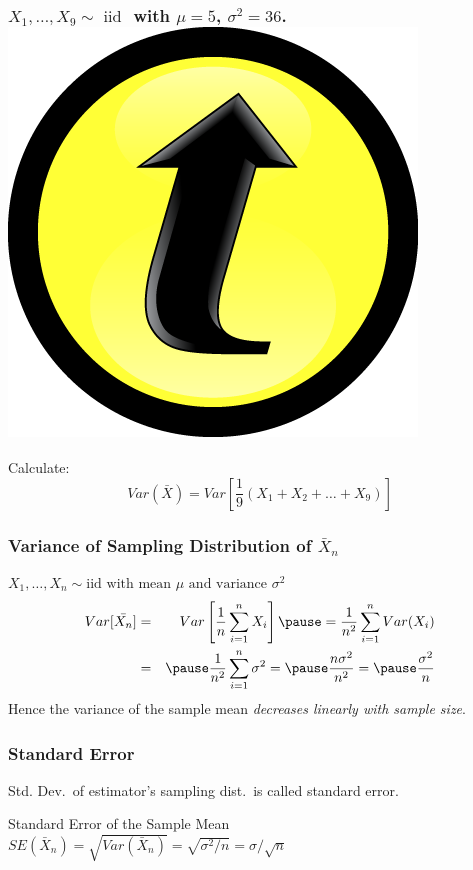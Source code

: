 \documentclass[handout]{beamer}
\begin{document}
\begin{frame}
\frametitle{$X_1,\hdots, X_{9} \sim \mbox{ iid }$ with $\mu=5$, $\sigma^2 = 36$. \hfill\includegraphics[scale = 0.05]{./images/clicker}}

\large Calculate:
	 $$Var(\bar{X}) = Var\left[\frac{1}{9}(X_1 + X_2 + \hdots + X_{9})\right]$$
\end{frame}

\begin{frame}
\frametitle{Variance of Sampling Distribution of $\bar{X}_n$}
\alert{$X_1, \hdots, X_n \sim \mbox{iid with mean }\mu \mbox{ and variance } \sigma^2$}
\begin{eqnarray*}
Var[\bar{X_n}] &=& Var\left[ \frac{1}{n}\sum_{i=1}^n X_i \right] \pause= \frac{1}{n^2} \sum_{i=1}^n Var(X_i) \\
&=& \pause \frac{1}{n^2} \sum_{i=1}^n \sigma^2 = \pause \frac{n\sigma^2}{n^2} = \pause \frac{\sigma^2}{n}
\end{eqnarray*}
\pause
\alert{Hence the variance of the sample mean \emph{decreases linearly with sample size}.}
\end{frame}
\begin{frame}
\frametitle{Standard Error}
Std. Dev.\ of estimator's sampling dist.\ is called \alert{standard error}.
\begin{block}{Standard Error of the Sample Mean}
$SE(\bar{X}_n)= \sqrt{Var\left(\bar{X}_n\right)}= \sqrt{\sigma^2/n}=\sigma/\sqrt{n}$
\end{block}
\end{frame}
\end{document}
